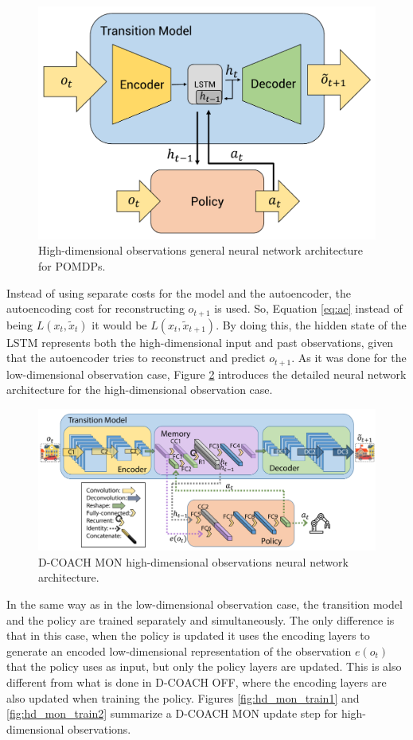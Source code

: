 \begin{figure}[h]
    \centering
    \includegraphics[width=0.5\linewidth]{imagenes/cap4/hd_model.pdf}
    \caption{High-dimensional observations general neural network architecture for POMDPs.}
    \label{fig:rnn_hd}
\end{figure}

Instead of using separate costs for the model and the autoencoder, the autoencoding cost for reconstructing $o_{t+1}$ is used. So, Equation \ref{eq:ae} instead of being $L(x_{t},\widetilde x_{t})$ it would be  $L(x_{t},\widetilde x_{t+1})$. By doing this, the hidden state of the LSTM represents both the high-dimensional input and past observations, given that the autoencoder tries to reconstruct and predict $o_{t+1}$. As it was done for the low-dimensional observation case, Figure \ref{fig:detailed_hd} introduces the detailed neural network architecture for the high-dimensional observation case.

\begin{figure}[h]
    \centering
    \includegraphics[width=\linewidth]{imagenes/cap4/hd_model_det.pdf}
    \caption{D-COACH MON high-dimensional observations neural network architecture.}
    \label{fig:detailed_hd}
\end{figure}

In the same way as in the low-dimensional observation case, the transition model and the policy are trained separately and simultaneously. The only difference is that in this case, when the policy is updated it uses the encoding layers to generate an encoded low-dimensional representation of the observation $e(o_{t})$ that the policy uses as input, but only the policy layers are updated. This is also different from what is done in D-COACH OFF, where the encoding layers are also updated when training the policy. Figures \ref{fig:hd_mon_train1} and \ref{fig:hd_mon_train2} summarize a D-COACH MON update step for high-dimensional observations.

